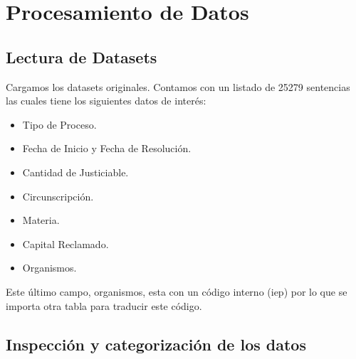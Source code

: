 \documentclass[runningheads,a4paper]{llncs}
\newenvironment{Shaded}{\footnotesize}{}
\newcommand{\KeywordTok}[1]{\textcolor[rgb]{0.00,0.44,0.13}{\textbf{{#1}}}}
\newcommand{\StringTok}[1]{\textcolor[rgb]{0.25,0.44,0.63}{{#1}}}
\newcommand{\CommentTok}[1]{\textcolor[rgb]{0.38,0.63,0.69}{\textit{{#1}}}}
\newcommand{\NormalTok}[1]{{#1}}
\newcommand{\OperatorTok}[1]{\textcolor[rgb]{0.40,0.40,0.40}{{#1}}}
\def\tightlist{} %
\begin{document}
\section{Procesamiento de Datos}\label{procesamiento-de-datos}

\subsection{Lectura de Datasets}\label{lectura-de-datasets}

Cargamos los datasets originales. Contamos con un listado de 25279
sentencias las cuales tiene los siguientes datos de interés:

\begin{itemize}
\tightlist
\item
  Tipo de Proceso.
\item
  Fecha de Inicio y Fecha de Resolución.
\item
  Cantidad de Justiciable.
\item
  Circunscripción.
\item
  Materia.
\item
  Capital Reclamado.
\item
  Organismos.
\end{itemize}

Este último campo, organismos, esta con un código interno (iep) por lo
que se importa otra tabla para traducir este código.

\begin{Shaded}
\end{Shaded}

\subsection{Inspección y categorización de los
datos}\label{inspeccion-y-categorizacion-de-los-datos}
\end{document}
